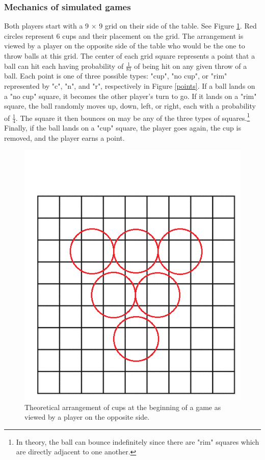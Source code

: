\documentclass{article}
\begin{document}
\subsubsection{Mechanics of simulated games}
Both players start with a 9 $\times$ 9 grid on their side of the table. See Figure \ref{9x9grid}. Red circles represent 6 cups and their placement on the grid. The arrangement is viewed by a player on the opposite side of the table who would be the one to throw balls at this grid. The center of each grid square represents a point that a ball can hit each having probability of $\frac{1}{81}$ of being hit on any given throw of a ball. Each point is one of three possible types: "cup", "no cup", or "rim" represented by "c", "n", and "r", respectively in Figure \ref{points}. If a ball lands on a "no cup" square, it becomes the other player's turn to go. If it lands on a "rim" square, the ball randomly moves up, down, left, or right, each with a probability of $\frac{1}{4}$. The square it then bounces on may be any of the three types of squares.\footnote{In theory, the ball can bounce indefinitely since there are "rim" squares which are directly adjacent to one another.} Finally, if the ball lands on a "cup" square, the player goes again, the cup is removed, and the player earns a point.

\begin{figure}
	\centering
	\includegraphics[width=0.7\linewidth]{gridwithcups}
	\caption{Theoretical arrangement of cups at the beginning of a game as viewed by a player on the opposite side.}
	\label{9x9grid}
\end{figure}
\end{document}
